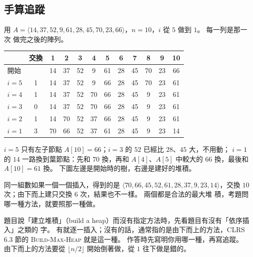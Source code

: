 \subsection{手算追蹤}

用 $A = \langle 14, 37, 52, 9, 61, 28, 45, 70, 23, 66 \rangle$，$n = 10$，$i$ 從 $5$ 做到
$1$。 每一列是那一次  做完之後的陣列。

\begin{center}
\begin{tabular}{lc*{10}{c}}
\toprule
& 交換 & 1 & 2 & 3 & 4 & 5 & 6 & 7 & 8 & 9 & 10 \\
\midrule
開始 & & 14 & 37 & 52 & 9 & 61 & 28 & 45 & 70 & 23 & 66 \\
$i = 5$ & 1 & 14 & 37 & 52 & 9 & 66 & 28 & 45 & 70 & 23 & 61 \\
$i = 4$ & 1 & 14 & 37 & 52 & 70 & 66 & 28 & 45 & 9 & 23 & 61 \\
$i = 3$ & 0 & 14 & 37 & 52 & 70 & 66 & 28 & 45 & 9 & 23 & 61 \\
$i = 2$ & 1 & 14 & 70 & 52 & 37 & 66 & 28 & 45 & 9 & 23 & 61 \\
$i = 1$ & 3 & 70 & 66 & 52 & 37 & 61 & 28 & 45 & 9 & 23 & 14 \\
\bottomrule
\end{tabular}
\end{center}

$i = 5$ 只有左子節點 $A[10] = 66$；$i = 3$ 的 $52$ 已經比 $28$、$45$ 大，不用動；
$i = 1$ 的 $14$ 一路換到葉節點：先和 $70$ 換，再和 $A[4]$、$A[5]$ 中較大的 $66$ 換，最後和
$A[10] = 61$ 換。 下圖左邊是開始時的樹，右邊是建好的堆積。

\begin{center}
\label{fig:hp-build}
\end{center}

同一組數如果一個一個插入，得到的是 $\langle 70, 66, 45, 52, 61, 28, 37, 9, 23, 14
\rangle$，交換 $10$ 次；由下而上建只交換 $6$ 次，結果也不一樣。 兩個都是合法的最大堆
積，考題問哪一種方法，就要照那一種做。

\begin{examnote}
題目說「建立堆積」（build a heap）而沒有指定方法時，先看題目有沒有「依序插入」之類的
字。 有就逐一插入；沒有的話，通常指的是由下而上的方法，CLRS 6.3 節的
\textsc{Build-Max-Heap} 就是這一種。 作答時先寫明你用哪一種，再寫追蹤。 由下而上的方法要從 $\lfloor n/2 \rfloor$ 開始倒著做，從 $1$ 往下做是錯的。
\end{examnote}

